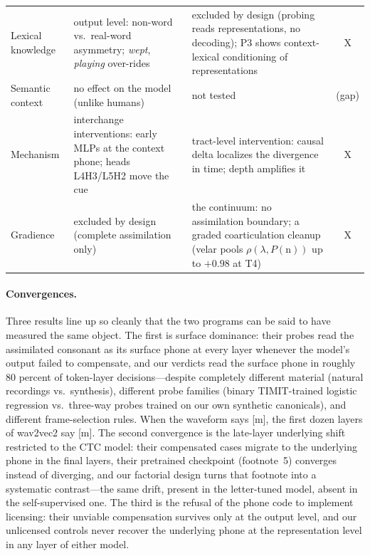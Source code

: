 \documentclass[11pt,a4paper]{article}
\newcommand{\lam}{\lambda}
\begin{document}
\begin{table}[htbp]
\begin{tabularx}{\textwidth}{@{}l Y Y c@{}}
Lexical knowledge & output level: non-word vs.\ real-word asymmetry;
\emph{wept}, \emph{playing} over-rides & excluded by design (probing
reads representations, no decoding); P3 shows context-lexical
conditioning of representations & X \\
Semantic context & no effect on the model (unlike humans) & not tested
& (gap) \\
Mechanism & interchange interventions: early MLPs at the context phone;
heads L4H3/L5H2 move the cue & tract-level intervention: causal delta
localizes the divergence in time; depth amplifies it & X \\
Gradience & excluded by design (complete assimilation only) & the
continuum: no assimilation boundary; a graded coarticulation cleanup
(velar pools $\rho(\lam, P(\mathrm{n}))$ up to $+0.98$ at T4) & X \\
\bottomrule
\end{tabularx}
\end{table}

\paragraph{Convergences.}
Three results line up so cleanly that the two programs can be said to
have measured the same object. The first is surface dominance: their
probes read the assimilated consonant as its surface phone at every
layer whenever the model's output failed to compensate, and our
verdicts read the surface phone in roughly 80 percent of token-layer
decisions---despite completely different material (natural recordings
vs.\ synthesis), different probe families (binary TIMIT-trained
logistic regression vs.\ three-way probes trained on our own synthetic
canonicals), and different frame-selection rules. When the waveform
says [m], the first dozen layers of wav2vec2 say [m]. The second
convergence is the late-layer underlying shift restricted to the CTC
model: their compensated cases migrate to the underlying phone in the
final layers, their pretrained checkpoint (footnote~5) converges
instead of diverging, and our factorial design turns that footnote into
a systematic contrast---the same drift, present in the letter-tuned
model, absent in the self-supervised one. The third is the refusal of
the phone code to implement licensing: their unviable compensation
survives only at the output level, and our unlicensed controls never
recover the underlying phone at the representation level in any layer
of either model.
\end{document}
